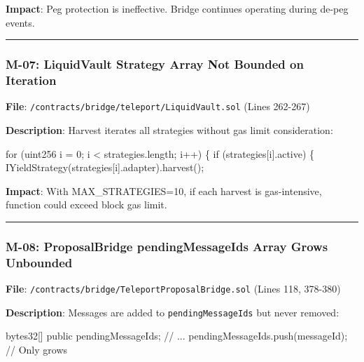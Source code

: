 \documentclass[
]{article}
\newenvironment{Shaded}{}{}
\newcommand{\NormalTok}[1]{#1}
\begin{document}
\textbf{Impact}: Peg protection is ineffective. Bridge continues
operating during de-peg events.

\begin{center}\rule{0.5\linewidth}{0.5pt}\end{center}

\subsubsection{M-07: LiquidVault Strategy Array Not Bounded on
Iteration}\label{m-07-liquidvault-strategy-array-not-bounded-on-iteration}

\textbf{File}: \texttt{/contracts/bridge/teleport/LiquidVault.sol}
(Lines 262-267)

\textbf{Description}: Harvest iterates all strategies without gas limit
consideration:

\begin{Shaded}
\begin{Highlighting}[]
\NormalTok{for (uint256 i = 0; i \textless{} strategies.length; i++) \{}
\NormalTok{    if (strategies[i].active) \{}
\NormalTok{        IYieldStrategy(strategies[i].adapter).harvest();}
\end{Highlighting}
\end{Shaded}

\textbf{Impact}: With MAX\_STRATEGIES=10, if each harvest is
gas-intensive, function could exceed block gas limit.

\begin{center}\rule{0.5\linewidth}{0.5pt}\end{center}

\subsubsection{M-08: ProposalBridge pendingMessageIds Array Grows
Unbounded}\label{m-08-proposalbridge-pendingmessageids-array-grows-unbounded}

\textbf{File}: \texttt{/contracts/bridge/TeleportProposalBridge.sol}
(Lines 118, 378-380)

\textbf{Description}: Messages are added to \texttt{pendingMessageIds}
but never removed:

\begin{Shaded}
\begin{Highlighting}[]
\NormalTok{bytes32[] public pendingMessageIds;}
\NormalTok{// ...}
\NormalTok{pendingMessageIds.push(messageId);  // Only grows}
\end{Highlighting}
\end{Shaded}
\end{document}
